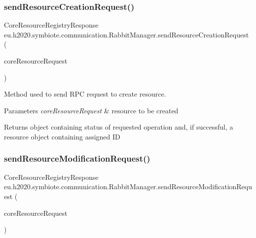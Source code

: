 \subsubsection{\texorpdfstring{send\+Resource\+Creation\+Request()}{sendResourceCreationRequest()}}
{\footnotesize\ttfamily Core\+Resource\+Registry\+Response eu.\+h2020.\+symbiote.\+communication.\+Rabbit\+Manager.\+send\+Resource\+Creation\+Request (\begin{DoxyParamCaption}\item[{Core\+Resource\+Registry\+Request}]{core\+Resource\+Request }\end{DoxyParamCaption})}

Method used to send R\+PC request to create resource.


\begin{DoxyParams}{Parameters}
{\em core\+Resource\+Request} & resource to be created \\
\hline
\end{DoxyParams}
\begin{DoxyReturn}{Returns}
object containing status of requested operation and, if successful, a resource object containing assigned ID 
\end{DoxyReturn}
\mbox{\label{classeu_1_1h2020_1_1symbiote_1_1communication_1_1RabbitManager_a2d8ecc7c67f2215a4e03dd082c6e39c0}} 
\subsubsection{\texorpdfstring{send\+Resource\+Modification\+Request()}{sendResourceModificationRequest()}}
{\footnotesize\ttfamily Core\+Resource\+Registry\+Response eu.\+h2020.\+symbiote.\+communication.\+Rabbit\+Manager.\+send\+Resource\+Modification\+Request (\begin{DoxyParamCaption}\item[{Core\+Resource\+Registry\+Request}]{core\+Resource\+Request }\end{DoxyParamCaption})}

